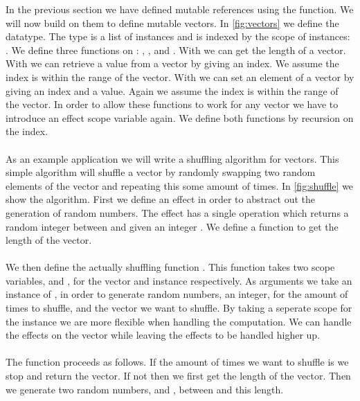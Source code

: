 In the previous section we have defined mutable references using the  function.
We will now build on them to define mutable vectors.
In \cref{fig:vectors} we define the  datatype.
The type  is a list of  instances and is indexed by the scope of instances: .
We define three functions on : , , and .
With  we can get the length of a vector.
With  we can retrieve a value from a vector by giving an index.
We assume the index is within the range of the vector.
With  we can set an element of a vector by giving an index and a value.
Again we assume the index is within the range of the vector.
In order to allow these functions to work for any vector we have to introduce an effect scope variable  again.
We define both functions by recursion on the index.
\\\\
As an example application we will write a shuffling algorithm for vectors.
This simple algorithm will shuffle a vector by randomly swapping two random elements of the vector and repeating this some amount of times.
In \cref{fig:shuffle} we show the algorithm.
First we define an effect  in order to abstract out the generation of random numbers.
The effect  has a single operation  which returns a random integer between  and  given an integer .
We define a function  to get the length of the vector.
\\\\
We then define the actually shuffling function .
This function takes two scope variables,  and , for the vector and  instance respectively.
As arguments we take an instance of , in order to generate random numbers, an integer, for the amount of times to shuffle, and the vector we want to shuffle.
By taking a seperate scope for the  instance we are more flexible when handling the computation.
We can handle the effects on the vector while leaving the  effects to be handled higher up.
\\\\
The function  proceeds as follows.
If the amount of times we want to shuffle is  we stop and return the vector.
If not then we first get the length of the vector.
Then we generate two random numbers,  and , between  and this length.
